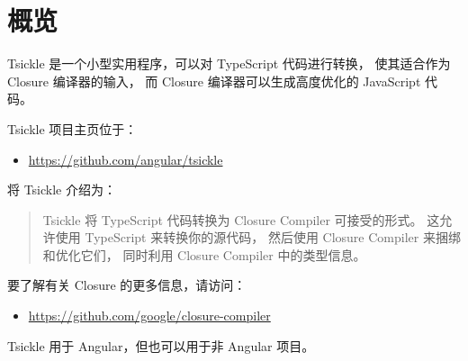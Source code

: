 \section{概览}


Tsickle 是一个小型实用程序，可以对 TypeScript 代码进行转换，
使其适合作为 Closure 编译器的输入，
而 Closure 编译器可以生成高度优化的 JavaScript 代码。


Tsickle 项目主页位于：

\begin{itemize}
  \item \url{https://github.com/angular/tsickle}
\end{itemize}


将 Tsickle 介绍为：


\begin{quote}
  Tsickle 将 TypeScript 代码转换为 Closure Compiler 可接受的形式。
  这允许使用 TypeScript 来转换你的源代码，
  然后使用 Closure Compiler 来捆绑和优化它们，
  同时利用 Closure Compiler 中的类型信息。
\end{quote}


要了解有关 Closure 的更多信息，请访问：

\begin{itemize}
  \item \url{https://github.com/google/closure-compiler}
\end{itemize}


Tsickle 用于 Angular，但也可以用于非 Angular 项目。

